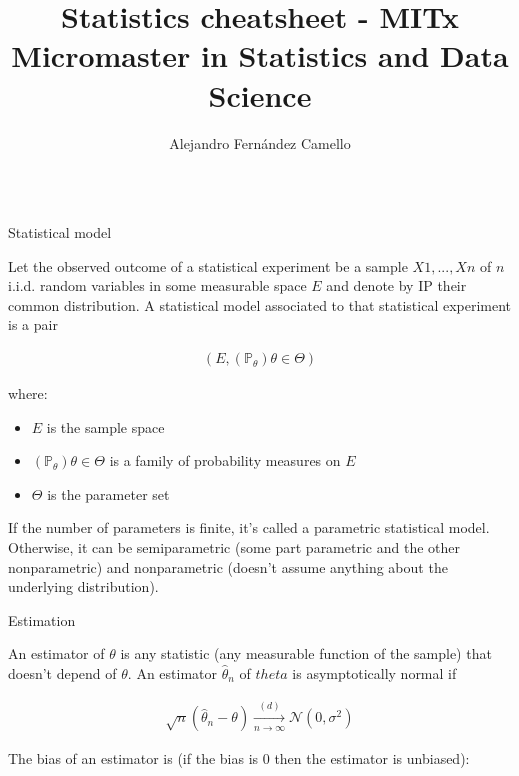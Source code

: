 \documentclass{beamer}
\title{Statistics cheatsheet - MITx Micromaster in Statistics and Data Science}
\author{Alejandro Fernández Camello}
\date{\vspace{-100pt}}
\begin{document}
\begin{frame}

\maketitle

\begin{columns}

\begin{column}{0.3\textwidth}
\begin{block}{Statistical model}

Let the observed outcome of a statistical experiment be a sample $X1, . . . , Xn$ of $n$ i.i.d. random variables in some measurable space $E$ and denote by IP their common distribution. A statistical model associated to that statistical experiment is a pair

\begin{align*}
    (E, (\mathbb{P}_\theta)\theta \in \Theta)
\end{align*}

where:

\begin{itemize}
    \item $E$ is the sample space
    \item $(\mathbb{P}_\theta)\theta \in \Theta$ is a family of probability measures on $E$
    \item $\Theta$ is the parameter set
\end{itemize}

If the number of parameters is finite, it's called a parametric statistical model. Otherwise, it can be semiparametric (some part parametric and the other nonparametric) and nonparametric (doesn't assume anything about the underlying distribution).
    
\end{block}

\begin{block}{Estimation}

An estimator of $\theta$ is any statistic (any measurable function of the sample) that doesn't depend of $\theta$. An estimator $\hat{\theta}_n$ of $theta$ is asymptotically normal if

\begin{align*}
    \sqrt{n}(\hat{\theta}_n - \theta) \xrightarrow[n \to \infty]{(d)} \mathcal{N}(0, \sigma^2)
\end{align*}

The bias of an estimator is (if the bias is 0 then the estimator is unbiased):


\end{block}
\end{column}
\end{columns}
\end{frame}
\end{document}
